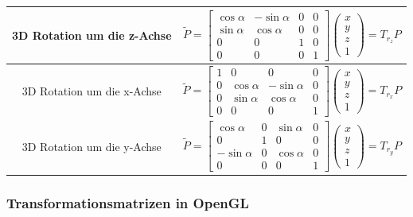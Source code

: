 \documentclass{scrartcl}
\begin{document}
\begin{tabular}{|c|c|}
	\hline 3D Rotation um die z-Achse & $\widetilde{P} = \begin{bmatrix}
	\cos \alpha & -\sin \alpha & 0 & 0 \\ \sin \alpha & \cos \alpha & 0 & 0 \\ 0 & 0 & 1 & 0 \\ 0 & 0 & 0 & 1
	\end{bmatrix} \begin{pmatrix}
	x \\
	y \\
	z \\
	1
	\end{pmatrix} = T_{r_z} P$ \\
	\hline 3D Rotation um die x-Achse & $\widetilde{P} = \begin{bmatrix}
	1 & 0 & 0 & 0 \\
	0 & \cos \alpha & -\sin \alpha & 0 \\
	0 & \sin \alpha & \cos \alpha & 0 \\
	0 & 0 & 0 & 1
	\end{bmatrix} \begin{pmatrix}
	x \\
	y \\
	z \\
	1
	\end{pmatrix} = T_{r_x} P$ \\
	\hline 3D Rotation um die y-Achse & $\widetilde{P} = \begin{bmatrix}
	\cos \alpha & 0 & \sin \alpha & 0 \\
	0 & 1 & 0 & 0 \\
	-\sin \alpha & 0 & \cos \alpha & 0 \\
	0 & 0 & 0 & 1
	\end{bmatrix} \begin{pmatrix}
	x \\
	y \\
	z \\
	1
	\end{pmatrix} = T_{r_y} P$ \\
	\hline
\end{tabular}

\subsubsection{Transformationsmatrizen in OpenGL}
\end{document}
